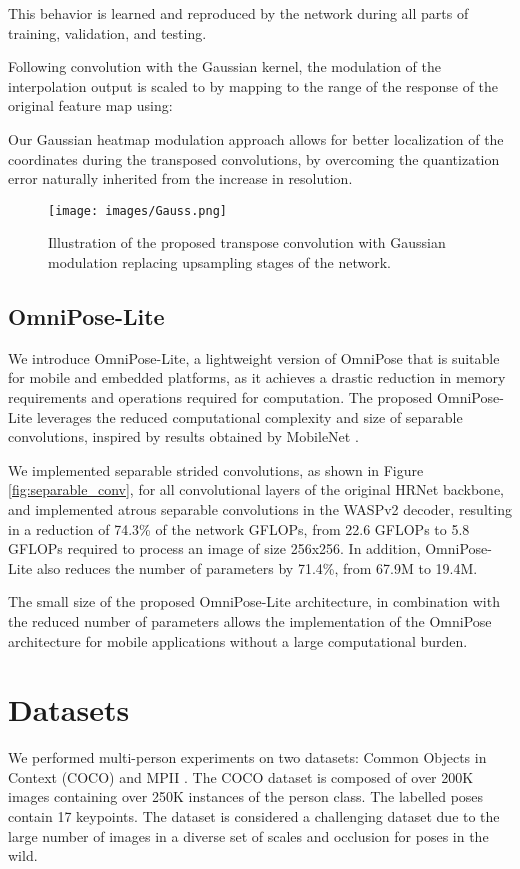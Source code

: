 \documentclass[10pt,twocolumn,letterpaper]{article}
\begin{document}
\label{convOperation}
\noindent 
This behavior is learned and reproduced by the network during all parts of training, validation, and testing.

Following convolution with the Gaussian kernel, the modulation of the interpolation output is scaled to  by mapping  to the range of the response of the original feature map  using:

\noindent 

Our Gaussian heatmap modulation approach allows for better localization of the coordinates during the transposed convolutions, by overcoming the quantization error naturally inherited from the increase in resolution. 


\begin{figure}[th]
\begin{center}
\texttt{[image: images/Gauss.png]}
\end{center}
  \caption{Illustration of the proposed transpose convolution with Gaussian modulation replacing upsampling stages of the network.}
\label{fig:Gauss}
\end{figure}

\subsection{OmniPose-Lite}
We introduce OmniPose-Lite, a lightweight version of OmniPose that is suitable for mobile and embedded platforms, as it achieves a drastic reduction in memory requirements and operations required for computation. The proposed OmniPose-Lite leverages the reduced computational complexity and size of separable convolutions, inspired by results obtained by MobileNet \cite{MobileNet}.

We implemented separable strided convolutions, as shown in Figure \ref{fig:separable_conv}, for all convolutional layers of the original HRNet backbone, and implemented atrous separable convolutions in the WASPv2 decoder, resulting in a reduction of 74.3\% of the network GFLOPs, from 22.6 GFLOPs to 5.8 GFLOPs required to process an image of size 256x256. In addition, OmniPose-Lite also reduces the number of parameters by 71.4\%, from 67.9M to 19.4M.

The small size of the proposed OmniPose-Lite architecture, in combination with the reduced number of parameters allows the implementation of the OmniPose architecture for mobile applications without a large computational burden.

\section{Datasets}
We performed multi-person experiments on two datasets: Common Objects in Context (COCO) \cite{COCO} and MPII \cite{MPII}.  
The COCO dataset \cite{COCO} is composed of over 200K images containing over 250K instances of the person class. The labelled poses contain 17 keypoints. The dataset is considered a challenging dataset due to the large number of images in a diverse set of scales and occlusion for poses in the wild.
\end{document}
